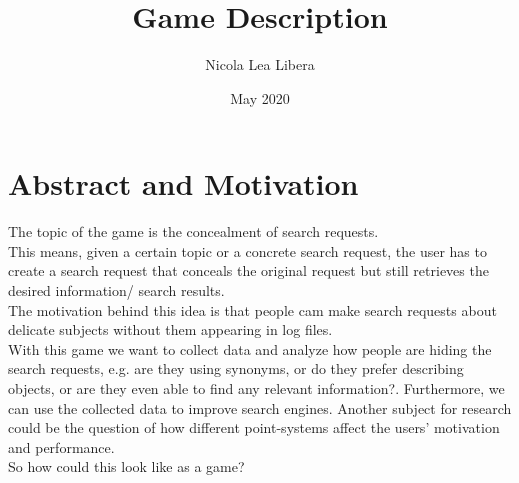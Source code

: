 \documentclass{article}
\theoremstyle{definition}
\theoremstyle{remark}
\begin{document}
\title{Game Description}
\author{\vspace{-2.0cm} Nicola Lea Libera}
\date{May 2020}
\maketitle

\section{Abstract and Motivation}
The topic of the game is the concealment of search requests.\\
This means, given a certain topic or a concrete search request, the user has to create a search request that conceals the original request but still retrieves the desired information/ search results. \\
The motivation behind this idea is that people cam make search requests about delicate subjects without them appearing in log files.\\
With this game we want to collect data and analyze how people are hiding the search requests, e.g. are they using synonyms, or do they prefer describing objects, or are they even able to find any relevant information?. Furthermore, we can use the collected data to improve search engines. Another subject for research could be the question of how different point-systems affect the users' motivation and performance.\\
So how could this look like as a game?
\end{document}
